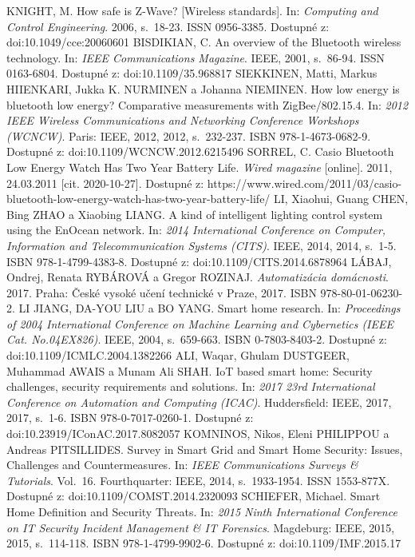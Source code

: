 \documentclass[twoside]{ctuthesis}
\theoremstyle{plain}
\theoremstyle{definition}
\theoremstyle{note}
\begin{document}
\begin{thebibliography}{46}
 KNIGHT, M. How safe is Z-Wave? [Wireless standards]. In: \textit{Computing and Control Engineering}. 2006, s.~18-23. ISSN 0956-3385. Dostupné z: doi:10.1049/cce:20060601
BISDIKIAN, C. An overview of the Bluetooth wireless technology. In: \textit{IEEE Communications Magazine}. IEEE, 2001, s.~86-94. ISSN 0163-6804. Dostupné z: doi:10.1109/35.968817
 SIEKKINEN, Matti, Markus HIIENKARI, Jukka K. NURMINEN a Johanna NIEMINEN. How low energy is bluetooth low energy? Comparative measurements with ZigBee/802.15.4. In: \textit{2012 IEEE Wireless Communications and Networking Conference Workshops (WCNCW)}. Paris: IEEE, 2012, 2012, s.~232-237. ISBN 978-1-4673-0682-9. Dostupné z: doi:10.1109/WCNCW.2012.6215496
SORREL, C. Casio Bluetooth Low Energy Watch Has Two Year Battery Life. \textit{Wired magazine} [online]. 2011, 24.03.2011 [cit. 2020-10-27]. Dostupné z: https://www.wired.com/2011/03/casio-bluetooth-low-energy-watch-has-two-year-battery-life/
LI, Xiaohui, Guang CHEN, Bing ZHAO a Xiaobing LIANG. A kind of intelligent lighting control system using the EnOcean network. In: \textit{2014 International Conference on Computer, Information and Telecommunication Systems (CITS)}. IEEE, 2014, 2014, s.~1-5. ISBN 978-1-4799-4383-8. Dostupné z: doi:10.1109/CITS.2014.6878964
LÁBAJ, Ondrej, Renata RYBÁROVÁ a Gregor ROZINAJ. \textit{Automatizácia domácnosti}. 2017. Praha: České vysoké učení technické v Praze, 2017. ISBN 978-80-01-06230-2.
  LI JIANG, DA-YOU LIU a BO YANG. Smart home research. In: \textit{Proceedings of 2004 International Conference on Machine Learning and Cybernetics (IEEE Cat. No.04EX826)}. IEEE, 2004, s.~659-663. ISBN 0-7803-8403-2. Dostupné z: doi:10.1109/ICMLC.2004.1382266
 ALI, Waqar, Ghulam DUSTGEER, Muhammad AWAIS a Munam Ali SHAH. IoT based smart home: Security challenges, security requirements and solutions. In: \textit{2017 23rd International Conference on Automation and Computing (ICAC)}. Huddersfield: IEEE, 2017, 2017, s.~1-6. ISBN 978-0-7017-0260-1. Dostupné z: doi:10.23919/IConAC.2017.8082057
KOMNINOS, Nikos, Eleni PHILIPPOU a Andreas PITSILLIDES. Survey in Smart Grid and Smart Home Security: Issues, Challenges and Countermeasures. In: \textit{IEEE Communications Surveys \& Tutorials}. Vol.~16. Fourthquarter: IEEE, 2014, s.~1933-1954. ISSN 1553-877X. Dostupné z: doi:10.1109/COMST.2014.2320093
SCHIEFER, Michael. Smart Home Definition and Security Threats. In: \textit{2015 Ninth International Conference on IT Security Incident Management \& IT Forensics}. Magdeburg: IEEE, 2015, 2015, s.~114-118. ISBN 978-1-4799-9902-6. Dostupné z: doi:10.1109/IMF.2015.17

\end{thebibliography}
\end{document}
